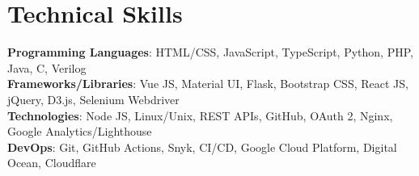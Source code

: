 \section{Technical Skills}
 \begin{itemize}[leftmargin=0.15in, label={}]
    \small{\item{
     \textbf{Programming Languages}{: HTML/CSS, JavaScript, TypeScript, Python, PHP, Java, C, Verilog} \\
     \textbf{Frameworks/Libraries}{: Vue JS, Material UI, Flask, Bootstrap CSS, React JS, jQuery, D3.js, Selenium Webdriver} \\
     \textbf{Technologies}{: Node JS, Linux/Unix, REST APIs, GitHub, OAuth 2, Nginx, Google Analytics/Lighthouse } \\
     \textbf{DevOps}{: Git, GitHub Actions, Snyk, CI/CD, Google Cloud Platform, Digital Ocean, Cloudflare }
    }}
 \end{itemize} 